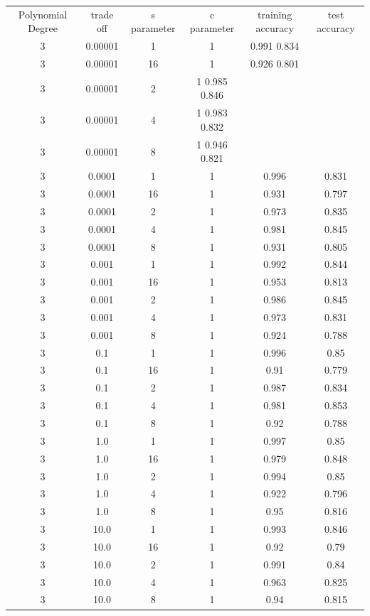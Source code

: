 \documentclass[a4paper,10pt,titlepage]{article}
\begin{document}
\begin{tabular}{c c c c c c} 
\hline\hline 
Polynomial Degree & trade off  & s parameter & c parameter & training accuracy & test accuracy \\
3 & 0.00001 & 1 & 1 & 0.991 0.834 \\
3 & 0.00001 & 16 & 1 & 0.926 0.801 \\
3 & 0.00001 & 2 & 1 0.985 0.846 \\
3 & 0.00001 & 4 & 1 0.983 0.832 \\
3 & 0.00001 & 8 & 1 0.946 0.821 \\
3 & 0.0001 & 1 & 1 & 0.996 & 0.831 \\
3 & 0.0001 & 16 & 1 & 0.931 & 0.797 \\
3 & 0.0001 & 2 & 1 & 0.973 & 0.835 \\
3 & 0.0001 & 4 & 1 & 0.981 & 0.845 \\
3 & 0.0001 & 8 & 1 & 0.931 & 0.805 \\
3 & 0.001 & 1 & 1 & 0.992 & 0.844 \\
3 & 0.001 & 16 & 1 & 0.953 & 0.813 \\
3 & 0.001 & 2 & 1 & 0.986 & 0.845 \\
3 & 0.001 & 4 & 1 & 0.973 & 0.831 \\
3 & 0.001 & 8 & 1 & 0.924 & 0.788 \\
3 & 0.1 & 1 & 1 & 0.996 & 0.85 \\
3 & 0.1 & 16 & 1 & 0.91 & 0.779 \\
3 & 0.1 & 2 & 1 & 0.987 & 0.834 \\
3 & 0.1 & 4 & 1 & 0.981 & 0.853 \\
3 & 0.1 & 8 & 1 & 0.92  & 0.788 \\
3 & 1.0 & 1 & 1 & 0.997 & 0.85 \\
3 & 1.0 & 16 & 1 & 0.979 & 0.848 \\
3 & 1.0 & 2 & 1 & 0.994 & 0.85 \\
3 & 1.0 & 4 & 1 & 0.922 & 0.796 \\
3 & 1.0 & 8 & 1 & 0.95  &0.816 \\
3 & 10.0 & 1 & 1 & 0.993 & 0.846 \\
3 & 10.0 & 16 & 1 & 0.92 & 0.79 \\
3 & 10.0 & 2 & 1 & 0.991 & 0.84 \\
3 & 10.0 & 4 & 1 & 0.963 & 0.825 \\
3 & 10.0 & 8 & 1 & 0.94  & 0.815 \\
\hline 
\end{tabular} 
\label{tab:dist_result}
\end{document}

